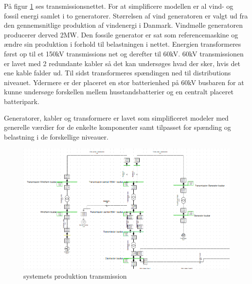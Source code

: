 På figur \ref{fig:SimTrans} ses transmissionsnettet. For at simplificere modellen er al vind- og fossil energi samlet i to generatorer. Størrelsen af vind generatoren er valgt ud fra den gennemsnitlige produktion af vindenergi i Danmark. Vindmølle generatoren producerer derved 2MW. Den fossile generator er sat som referencemaskine og ændre sin produktion i forhold til belastningen i nettet. Energien transformeres først op til et 150kV transmissions net og derefter til 60kV. 60kV transmissionen er lavet med 2 redundante kabler så det kan undersøges hvad der sker, hvis det ene kable falder ud. Til sidst transformeres spændingen ned til distributions niveauet. Ydermere er der placeret en stor batterienhed på 60kV busbaren for at kunne undersøge forskellen mellem husstandsbatterier og en centralt placeret batteripark.

Generatorer, kabler og transformere er lavet som simplificeret modeler med generelle værdier for de enkelte komponenter samt tilpasset for spænding og belastning i de forskellige niveauer.
 

\begin{figure}[H] %
	\centering
	\includegraphics[width=1\textwidth]{figurer/Sim_model_1}
	\caption{systemets produktion transmission}
	\label{fig:SimTrans}
\end{figure}
